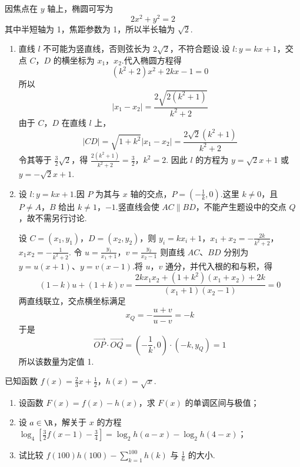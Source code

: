 \begin{solution}
因焦点在 \(y\) 轴上，椭圆可写为
\[
2x^2+y^2=2
\]
其中半短轴为 1，焦距参数为 1，所以半长轴为 \(\sqrt2\).

\begin{enumerate}
\item 直线 \(l\) 不可能为竖直线，否则弦长为 \(2\sqrt2\)，不符合题设.设 \(l:y=kx+1\)，交点 \(C\)，\(D\) 的横坐标为 \(x_1\)，\(x_2\).代入椭圆方程得
\[
 (k^2+2)x^2+2kx-1=0
\]
所以
\[
\left|x_1-x_2\right|=\frac{2\sqrt{2(k^2+1)}}{k^2+2}
\]
由于 \(C\)，\(D\) 在直线 \(l\) 上，
\[
|CD|=\sqrt{1+k^2}|x_1-x_2|=\frac{2\sqrt2(k^2+1)}{k^2+2}
\]
令其等于 \(\frac32\sqrt2\)，得
\(\frac{2(k^2+1)}{k^2+2}=\frac32\)，\(k^2=2\).
因此 \(l\) 的方程为 \(y=\sqrt2x+1\) 或 \(y=-\sqrt2x+1\).

\item 设 \(l:y=kx+1\).因 \(P\) 为其与 \(x\) 轴的交点，\(P=(-\frac{1}{k},0)\).这里 \(k\neq0\)，且 \(P\neq A\)，\(B\) 给出 \(k\neq1\)，\(-1\).竖直线会使 \(AC\parallel BD\)，不能产生题设中的交点 \(Q\)，故不需另行讨论.

设 \(C=(x_1,y_1)\)，\(D=(x_2,y_2)\)，则
\(y_i=kx_i+1\)，\(x_1+x_2=-\frac{2k}{k^2+2}\)，\(x_1x_2=-\frac{1}{k^2+2}\).
令
\(u=\frac{y_1}{x_1+1}\)，\(v=\frac{y_2}{x_2-1}\)
则直线 \(AC\)、\(BD\) 分别为 \(y=u(x+1)\)、\(y=v(x-1)\).将 \(u\)，\(v\) 通分，并代入根的和与积，得
\[
(1-k)u+(1+k)v
=\frac{2kx_1x_2+(1+k^2)(x_1+x_2)+2k}{(x_1+1)(x_2-1)}=0
\]
两直线联立，交点横坐标满足
\[
x_Q=-\frac{u+v}{u-v}=-k
\]
于是
\[
\overrightarrow{OP}\cdot\overrightarrow{OQ}
 =\left(-\frac1k,0\right)\cdot(-k,y_Q)=1
\]
所以该数量为定值 1.
\end{enumerate}
\end{solution}

\begin{problem}
已知函数 \(f(x)=\frac{2}{3}x+\frac{1}{2}\)，\(h(x)=\sqrt{x}\).
\begin{enumerate}
\item 设函数 \(F(x)=f(x)-h(x)\)，求 \(F(x)\) 的单调区间与极值；
\item 设 \(a\in\R\)，解关于 \(x\) 的方程 \(\log_{4}\left[\frac{3}{2}f(x-1)-\frac{3}{4}\right]=\log_{2}h(a-x)-\log_{2}h(4-x)\)；
\item 试比较 \(f(100)h(100)-\displaystyle\sum_{k=1}^{100}h(k)\) 与 \(\frac{1}{6}\) 的大小.
\end{enumerate}
\end{problem}

